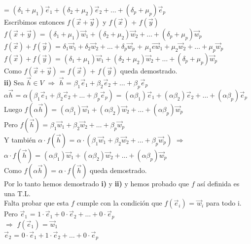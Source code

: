 \documentclass[11pt]{article}
\begin{document}
= $(\delta_1 + \mu_1)\vec{e}_1 + (\delta_2 + \mu_2) \vec{e}_2 + \hdots + (\delta_p + \mu_p) \vec{e}_p$\\
Escribimos entonces $f(\vec{x} + \vec{y})$ y $f(\vec{x})$ + $f(\vec{y})$\\
$f(\vec{x} + \vec{y})$ = $(\delta_1 + \mu_1)\vec{w}_1 + (\delta_2 + \mu_2) \vec{w}_2 + \hdots + (\delta_p + \mu_p) \vec{w}_p$ \\
$f(\vec{x}) + f(\vec{y})$ = $\delta_1\vec{w}_1 + \delta_2 \vec{w}_2 + \hdots + \delta_p \vec{w}_p$ + $\mu_1\vec{ew}_1 + \mu_2 \vec{w}_2 + \hdots + \mu_p \vec{w}_p$\\
$f(\vec{x}) + f(\vec{y})$ = $(\delta_1 + \mu_1)\vec{w}_1 + (\delta_2 + \mu_2) \vec{w}_2 + \hdots + (\delta_p + \mu_p) \vec{w}_p$\\
Como $f(\vec{x} + \vec{y})$ = $f(\vec{x})$ + $f(\vec{y})$ queda demostrado.\\
{\bfseries ii)} Sea $\vec{h} \in V$ $\Rightarrow$ $\vec{h}$ = $\beta_1\vec{e}_1 + \beta_2 \vec{e}_2 + \hdots + \beta_p\vec{e}_p$ \\
$\alpha \vec{h}$ = $\alpha(\beta_1\vec{e}_1 + \beta_2 \vec{e}_2 + \hdots + \beta_p\vec{e}_p)$ = $(\alpha \beta_1)\vec{e}_1 + (\alpha \beta_2)\vec{e}_2 + \hdots + (\alpha \beta_p)\vec{e}_p$ \\
Luego $f(\alpha \vec{h})$ = $(\alpha \beta_1)\vec{w}_1 + (\alpha \beta_2)\vec{w}_2 + \hdots + (\alpha \beta_p)\vec{w}_p$ \\
Pero $f(\vec{h})$ = $\beta_1\vec{w}_1 + \beta_2 \vec{w}_2 + \hdots + \beta_p\vec{w}_p$\\
Y también $\alpha \cdot f(\vec{h})$ = $\alpha \cdot (\beta_1\vec{w}_1 + \beta_2 \vec{w}_2 + \hdots + \beta_p\vec{w}_p)$ $\Rightarrow$ \\
$\alpha \cdot f(\vec{h})$ = $(\alpha \beta_1)\vec{w}_1 + (\alpha \beta_2)\vec{w}_2 + \hdots + (\alpha \beta_p)\vec{w}_p$\\
Como  $f(\alpha \vec{h})$ = $\alpha \cdot f(\vec{h})$ queda demostrado. \\
Por lo tanto hemos demostrado {\bfseries i)} y {\bfseries ii)} y hemos probado que $f$ así definida es una T.L.\\
Falta probar que esta $f$ cumple con la condición que $f(\vec{e}_i)$ = $\vec{w}_i$ para todo i. \\
Pero $\vec{e}_1$ = $1 \cdot \vec{e}_1 + 0 \cdot \vec{e}_2 + \hdots + 0 \cdot \vec{e}_p$ \\
$\Rightarrow$ $f(\vec{e}_1)$ = $\vec{w}_1$ \\
$\vec{e}_2$ = $0 \cdot \vec{e}_1 + 1 \cdot \vec{e}_2 + \hdots + 0 \cdot \vec{e}_p$ \\
\end{document}
